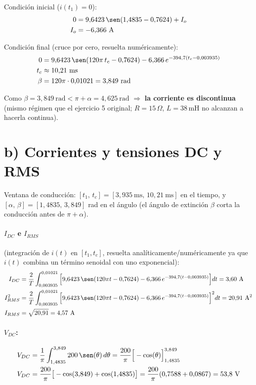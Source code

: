 \documentclass[11pt]{article}
\begin{document}
Condici\'on inicial ($i(t_1)=0$):
\begin{align*}
0 &= 9{,}6423\,\sen(1{,}4835 - 0{,}7624) + I_o \\
I_o &= -6{,}366\ \text{A}
\end{align*}

Condici\'on final (cruce por cero, resuelta num\'ericamente):
\begin{align*}
0 &= 9{,}6423\,\sen(120\pi\,t_c - 0{,}7624) - 6{,}366\,e^{-394{,}7(t_c - 0{,}003935)} \\
t_c &\approx 10{,}21\ \text{ms} \\
\beta &= 120\pi \cdot 0{,}01021 = 3{,}849\ \text{rad}
\end{align*}

Como $\beta = 3{,}849\ \text{rad} < \pi+\alpha = 4{,}625\ \text{rad}$
$\Rightarrow$ \textbf{la corriente es discontinua} (mismo r\'egimen que el
ejercicio 5 original; $R=15\,\Omega$, $L=38$\,mH no alcanzan a hacerla continua).

\section*{b) Corrientes y tensiones DC y RMS}

Ventana de conducci\'on: $[t_1,\,t_c]=[3{,}935\ \text{ms},\,10{,}21\ \text{ms}]$
en el tiempo, y $[\alpha,\,\beta]=[1{,}4835,\,3{,}849]$ rad en el \'angulo
(el \'angulo de extinci\'on $\beta$ corta la conducci\'on antes de $\pi+\alpha$).

\paragraph{$I_{DC}$ e $I_{RMS}$} (integraci\'on de $i(t)$ en $[t_1,t_c]$,
resuelta anal\'iticamente/num\'ericamente ya que $i(t)$ combina un t\'ermino
senoidal con uno exponencial):
\begin{align*}
I_{DC} &= \frac{2}{T}\int_{0{,}003935}^{0{,}01021}
          \Big[9{,}6423\,\sen(120\pi t - 0{,}7624) - 6{,}366\,e^{-394{,}7(t-0{,}003935)}\Big]dt = 3{,}60\ \text{A} \\
I_{RMS}^2 &= \frac{2}{T}\int_{0{,}003935}^{0{,}01021}
          \Big[9{,}6423\,\sen(120\pi t - 0{,}7624) - 6{,}366\,e^{-394{,}7(t-0{,}003935)}\Big]^2 dt = 20{,}91\ \text{A}^2 \\
I_{RMS} &= \sqrt{20{,}91} = 4{,}57\ \text{A}
\end{align*}

\paragraph{$V_{DC}$:}
\begin{align*}
V_{DC} &= \frac{1}{\pi}\int_{1{,}4835}^{3{,}849} 200\,\sen(\theta)\,d\theta
       = \frac{200}{\pi}\Big[-\cos(\theta)\Big]_{1{,}4835}^{3{,}849} \\
V_{DC} &= \frac{200}{\pi}\big[-\cos(3{,}849)+\cos(1{,}4835)\big] = \frac{200}{\pi}(0{,}7588+0{,}0867) = 53{,}8\ \text{V}
\end{align*}
\end{document}
